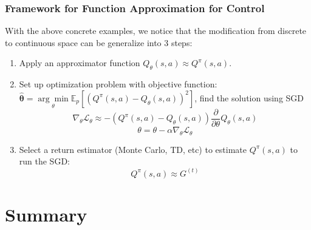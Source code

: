 \documentclass[11pt]{article}
\begin{document}
\subsubsection{Framework for Function Approximation for Control}
With the above concrete examples, we notice that the modification from discrete to continuous space can be generalize into 3 steps:
\begin{enumerate}
    \item Apply an approximator function $Q_{\theta}(s, a) \approx Q^{\pi}(s, a)$.
    \item Set up optimization problem with objective function: $\hat{\boldsymbol{\theta}}=\underset{\theta}{\arg \min } \mathbb{E}_{p}\left[\left(Q^{\pi}(s, a)-Q_{\theta}(s, a)\right)^{2}\right]$, find the solution using SGD $$\nabla_{\theta} \mathcal{L}_{\theta} \approx-\left(Q^{\pi}(s, a)-Q_{\theta}(s, a)\right) \frac{\partial}{\partial \theta} Q_{\theta}(s, a)$$ $$\theta=\theta-\alpha\nabla_{\theta} \mathcal{L}_{\theta}$$
    \item Select a return estimator (Monte Carlo, TD, etc) to estimate $Q^{\pi}(s, a)$ to run the SGD: $$Q^{\pi}(s, a) \approx G^{(t)}$$
\end{enumerate}


\section{Summary}
\end{document}
